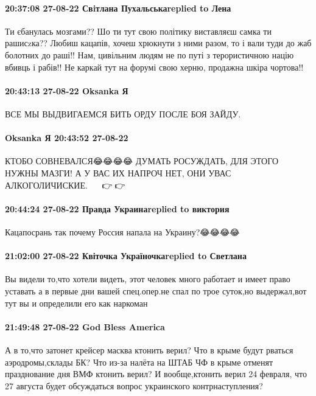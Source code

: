 \paragraph{20:37:08 27-08-22 Свiтлана Пухальськаreplied to Лена}

Ти єбанулась мозгами?? Шо ти тут свою політику виставляєш самка ти рашисzка??
Любиш кацапів, хочеш хрюкнути з ними разом, то і вали туди до жаб болотних до
раші!! Нам, цивільним людям не по путі з терористичною націю вбивць і рабів!!
Не каркай тут на форумі свою херню, продажна шкіра чортова!!

\paragraph{20:43:13 27-08-22 Oksanka Я}

ВСЕ МЫ ВЫДВИГАЕМСЯ БИТЬ ОРДУ ПОСЛЕ БОЯ ЗАЙДУ.

\paragraph{Oksanka Я 20:43:52 27-08-22}

КТОБО СОВНЕВАЛСЯ😂😂😂😂 ДУМАТЬ РОСУЖДАТЬ, ДЛЯ ЭТОГО НУЖНЫ МАЗГИ! А У ВАС ИХ
НАПРОЧ НЕТ, ОНИ УВАС АЛКОГОЛИЧИСКИЕ.🤣🤣🤣🤣🤣🤣👉🤣👉🤣

\paragraph{20:44:24 27-08-22 Правда Украинаreplied to виктория}

Кацапосрань так почему Россия напала на Украину?😂😂😂😂

\paragraph{21:02:00 27-08-22 Квіточка Україночкаreplied to Светлана}

Вы видели то,что хотели видеть, этот человек много работает и имеет право
уставать а в первые дни вашей спец.опер.не спал по трое суток,но выдержал,вот
тут вы и определили его как наркоман

\paragraph{21:49:48 27-08-22 God Bless America}

А в то,что затонет крейсер масква ктонить верил? Что в крыме будут рваться
аэродромы,склады БК? Что из-за налёта на ШТАБ ЧФ в крыме отменят празднование
дня ВМФ ктонить верил? И вообще,ктонить верил 24 февраля, что 27 августа будет
обсуждаться вопрос украинского контрнаступления?

